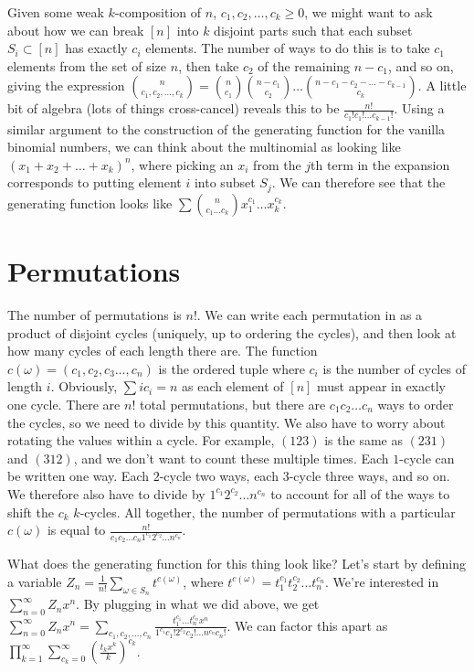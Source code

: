 Given some weak $k$-composition of $n$, $c_1,c_2,\dots,c_k \geq 0$, we might want to ask about how we can break $[n]$ into $k$ disjoint parts such that each subset $S_i\subset [n]$ has exactly $c_i$ elements.  The number of ways to do this is to take $c_1$ elements from the set of size $n$, then take $c_2$ of the remaining $n-c_1$, and so on, giving the expression $\binom{n}{c_1,c_2,\dots,c_k} = \binom{n}{c_1}\binom{n-c_1}{c_2}\dots \binom{n-c_1-c_2-\dots -c_{k-1}}{c_k}$. A little bit of algebra (lots of things cross-cancel) reveals this to be $\frac{n!}{c_1!c_1!\dots c_{k-1}!}$.  Using a similar argument to the construction of the generating function for the vanilla binomial numbers, we can think about the multinomial as looking like $(x_1+x_2+\dots+x_k)^n$, where picking an $x_i$ from the $j$th term in the expansion corresponds to putting element $i$ into subset $S_j$.  We can therefore see that the generating function looks like $\sum \binom{n}{c_1\dots c_k}x_1^{c_1}\dots x_k^{c_k}$.

\section*{Permutations}


The number of permutations is $n!$.  We can write each permutation in as a product of disjoint cycles (uniquely, up to ordering the cycles), and then look at how many cycles of each length there are.  The function $c(\omega) = (c_1,c_2,c_3\dots, c_n)$ is the ordered tuple where $c_i$ is the number of cycles of length $i$.  Obviously, $\sum ic_i = n$ as each element of $[n]$ must appear in exactly one cycle.
 There are $n!$ total permutations, but there are $c_1c_2\dots c_n$ ways to order the cycles, so we need to divide by this quantity.  We also have to worry about rotating the values within a cycle.  For example, $(123)$ is the same as $(231)$ and $(312)$, and we don't want to count these multiple times.  Each $1$-cycle can be written one way.  Each $2$-cycle two ways, each $3$-cycle three ways, and so on.  We therefore also have to divide by $1^{c_1} 2^{c_2} \dots n^{c_n}$ to account for all of the ways to shift the $c_k$ $k$-cycles.  All together, the number of permutations with a particular $c(\omega)$ is equal to $\frac{n!}{c_1c_2\dots c_n1^{c_1} 2^{c_2} \dots n^{c_n}}$.
 
 What does the generating function for this thing look like?  Let's start by defining a variable $Z_n = \frac{1}{n!}\sum\limits_{\omega\in S_n}t^{c(\omega)}$, where $t^{c(\omega)} = t_1^{c_1}t_2^{c_2}\dots t_n^{c_n}$.  We're interested in $\sum\limits_{n=0}^\infty Z_nx^n$.  By plugging in what we did above, we get $\sum\limits_{n=0}^\infty Z_nx^n = \sum\limits_{c_1,c_2,\dots,c_n}\frac{t_1^{c_1}\dots t_n^{c_n}x^n}{1^{c_1}c_1!2^{c_2}c_2!\dots n^{c_n} c_n!}$.  We can factor this apart as $\prod\limits_{k=1}^\infty\sum\limits_{c_k = 0}^\infty \left( \frac{t_kx^k}{k} \right) ^{c_k}$.